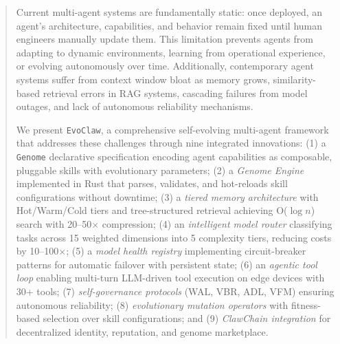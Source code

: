 \documentclass{article}
\newcommand{\evoclaw}{\texttt{EvoClaw}\xspace}
\newcommand{\genome}{\texttt{Genome}\xspace}
\begin{document}
\linenumbers

\maketitle

\begin{abstract}
Current multi-agent systems are fundamentally static: once deployed, an agent's architecture, capabilities, and behavior remain fixed until human engineers manually update them. This limitation prevents agents from adapting to dynamic environments, learning from operational experience, or evolving autonomously over time. Additionally, contemporary agent systems suffer from context window bloat as memory grows, similarity-based retrieval errors in RAG systems, cascading failures from model outages, and lack of autonomous reliability mechanisms.

We present \evoclaw{}, a comprehensive self-evolving multi-agent framework that addresses these challenges through nine integrated innovations: (1) a \genome{} declarative specification encoding agent capabilities as composable, pluggable skills with evolutionary parameters; (2) a \textit{Genome Engine} implemented in Rust that parses, validates, and hot-reloads skill configurations without downtime; (3) a \textit{tiered memory architecture} with Hot/Warm/Cold tiers and tree-structured retrieval achieving O($\log n$) search with 20--50$\times$ compression; (4) an \textit{intelligent model router} classifying tasks across 15 weighted dimensions into 5 complexity tiers, reducing costs by 10--100$\times$; (5) a \textit{model health registry} implementing circuit-breaker patterns for automatic failover with persistent state; (6) an \textit{agentic tool loop} enabling multi-turn LLM-driven tool execution on edge devices with 30+ tools; (7) \textit{self-governance protocols} (WAL, VBR, ADL, VFM) ensuring autonomous reliability; (8) \textit{evolutionary mutation operators} with fitness-based selection over skill configurations; and (9) \textit{ClawChain integration} for decentralized identity, reputation, and genome marketplace.


\end{abstract}
\end{document}
